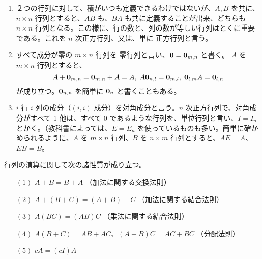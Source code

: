 \note
\begin{enumerate}
\item ２つの行列に対して、積がいつも定義できるわけではないが、$A, B$ を共に、$n\times n$ 行列とすると、$AB$ も、$BA$ も共に定義することが出来、どちらも $n\times n$ 行列となる。この様に、行の数と、列の数が等しい行列はとくに重要である。これを $n$ 次正方行列、又は、単に 正方行列と言う。

\item すべて成分が零の $m\times n$ 行列を 零行列と言い、$\mbox{\boldmath $0$} = \mbox{\boldmath $0$}_{m,n}$ と書く。
$A$ を $m\times n$ 行列とすると、
$$A + \mbox{\boldmath $0$}_{m,n} = \mbox{\boldmath $0$}_{m,n} + A = A, \;A\mbox{\boldmath $0$}_{n,l} = \mbox{\boldmath $0$}_{m,l}, \;\mbox{\boldmath $0$}_{l,m}A = \mbox{\boldmath $0$}_{l,n}$$
が成り立つ。$\mbox{\boldmath $0$}_{n,n}$ を簡単に $\mbox{\boldmath $0$}_n$ と書くこともある。

\item $i$ 行 $i$ 列の成分（$(i,i)$ 成分）を対角成分と言う。$n$ 次正方行列で、対角成分がすべて 1 他は、すべて 0 であるような行列を、単位行列と言い、$I = I_n$ とかく。（教科書によっては、$E = E_n$  を使っているものも多い。簡単に確かめられるように、$A$ を $m\times n$ 行列、$B$ を $n\times m$ 行列とすると、$AE = A$、$EB = B$。

\end{enumerate}
\smallskip

\begin{prop}
行列の演算に関して次の諸性質が成り立つ。
\begin{itemize}
\item[$(1)$] $A + B = B + A$ \hfill（加法に関する交換法則）
\item[$(2)$] $A + (B + C) = (A + B) + C$ \hfill （加法に関する結合法則）
\item[$(3)$] $A(BC) = (AB)C$ \hfill （乗法に関する結合法則）
\item[$(4)$] $A(B+C) = AB + AC$、$(A+B)C = AC + BC$ \hfill （分配法則）
\item[$(5)$] $cA = (cI)A$
\end{itemize}
\end{prop}

